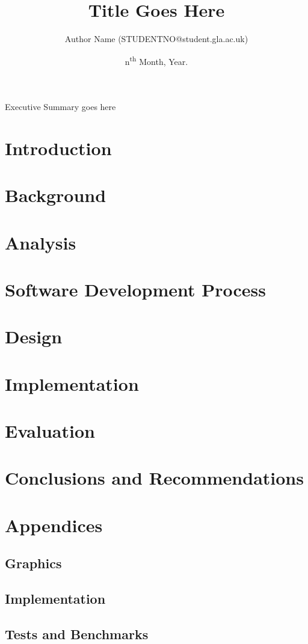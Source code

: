 \documentclass{uofg-workplace-assessment}
\title{Title Goes Here}
\author{Author Name (STUDENTNO@student.gla.ac.uk)}
\date{n\textsuperscript{th} Month, Year.}
\begin{document}
\maketitle
\begin{ExecutiveSummary}
  Executive Summary goes here
\end{ExecutiveSummary}

\noeducationalconsent


\newpage
\begingroup
\fontsize{10.5pt}{12.5pt}
\selectfont
\tableofcontents
\endgroup
\newpage


\section{Introduction}
\section{Background}
\section{Analysis}
\section{Software Development Process}
\section{Design}
\section{Implementation}
\section{Evaluation}
\section{Conclusions and Recommendations}


\newpage


\newpage


\newpage
\appendix
\section{Appendices}
\subsection{Graphics}
\subsection{Implementation}
\subsection{Tests and Benchmarks}
\end{document}
